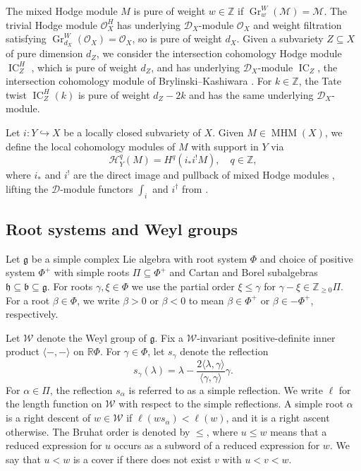 \documentclass[12pt]{amsart}
\theoremstyle{definition}
\numberwithin{equation}{section}
\newcommand{\g}{\mathfrak g}
\newcommand{\W}{\mathscr W}
\begin{document}
The mixed Hodge module $M$ is pure of weight $w\in \mathbb{Z}$ if $\operatorname{Gr}_w^W(\mathscr{M})=\mathscr{M}$. The trivial Hodge module $\mathscr{O}_X^H$ has underlying $\mathscr{D}_X$-module $\mathscr{O}_X$ and weight filtration satisfying $\operatorname{Gr}_{d_X}^W(\mathscr{O}_X)=\mathscr{O}_X$, so is pure of weight $d_X$. Given a subvariety $Z\subseteq X$ of pure dimension $d_Z$, we consider the intersection cohomology Hodge module $\operatorname{IC}_Z^H$ \cite[Section 8.3.3(m13)]{htt}, which is pure of weight $d_Z$, and has underlying $\mathscr{D}_X$-module $\operatorname{IC}_Z$, the intersection cohomology module of Brylinski--Kashiwara \cite[Definition 3.4.1]{htt}. For $k\in \mathbb{Z}$, the Tate twist $\operatorname{IC}_Z^H(k)$ is pure of weight $d_Z-2k$ and has the same underlying $\mathscr{D}_X$-module.

Let $i:Y\hookrightarrow X$ be a locally closed subvariety of $X$. Given $M\in \operatorname{MHM}(X)$, we define the local cohomology modules of $M$ with support in $Y$ via
\begin{equation}
\mathscr{H}^q_Y(M)=H^q(i_{\ast}i^{!}M),\quad q\in \mathbb{Z},    
\end{equation}
where $i_{\ast}$ and $i^{!}$ are the direct image and pullback of mixed Hodge modules \cite[Section 4]{saito90}, lifting the $\mathscr{D}$-module functors $\int_i$ and $i^{\dagger}$ from \cite[Chapter 1.5]{htt}. 


\subsection{Root systems and Weyl groups}




Let $\g$ be a simple complex Lie algebra with root system $\Phi$ and choice of positive system $\Phi^+$ with simple roots $\Pi \subseteq \Phi^+$ and Cartan and Borel subalgebras $\mathfrak{h}\subseteq \mathfrak{b}\subseteq  \g$. For roots $\gamma,\xi \in \Phi$ we use the partial order $\xi\leq\gamma$ for $\gamma-\xi\in\mathbb{Z}_{\geq 0}\Pi$. For a root $\beta
\in \Phi$, we write $\beta>0$ or $\beta<0$ to mean
$\beta\in\Phi^+$ or $\beta\in-\Phi^+$, respectively.




Let $\W$ denote the Weyl group of $\g$. Fix a $\W$-invariant positive-definite inner product
$\langle-,-\rangle$ on $\mathbb{R}\Phi$. For $\gamma\in\Phi$, let
$s_\gamma$ denote the reflection
\begin{equation}\label{eq:root-reflection}
s_\gamma(\lambda)
=
\lambda-\frac{2\langle\lambda,\gamma\rangle}
                 {\langle\gamma,\gamma\rangle}\gamma.
\end{equation}
For $\alpha\in \Pi$, the reflection $s_{\alpha}$ is referred to as a simple reflection. We write $\ell$ for the length function on $\W$ with respect to the simple reflections. A simple root $\alpha$ is a right descent of $w\in \W$ if
$\ell(ws_\alpha)<\ell(w)$, and it is a right ascent otherwise. The Bruhat order is denoted by $\leq$, where $u\leq w$ means that a reduced expression for $u$ occurs as a subword of a reduced expression for $w$. We say that $u<w$ is a cover if there does not exist $v$ with $u<v<w$.
\end{document}
